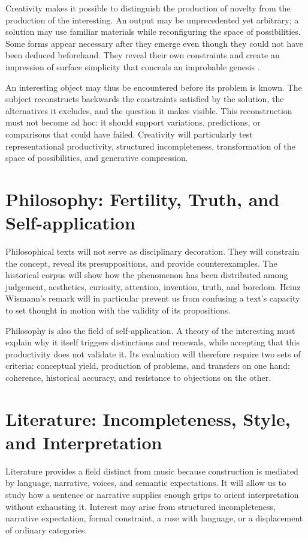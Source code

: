 \documentclass[11pt,a4paper]{article}
\begin{document}
Creativity makes it possible to distinguish the production of novelty from the
production of the interesting. An output may be unprecedented yet arbitrary; a
solution may use familiar materials while reconfiguring the space of
possibilities. Some forms appear necessary after they emerge even though they
could not have been deduced beforehand. They reveal their own constraints and
create an impression of surface simplicity that conceals an improbable genesis
\parencite{pachet2026impossibilite,pachet2026virtuosite}.

An interesting object may thus be encountered before its problem is known. The
subject reconstructs backwards the constraints satisfied by the solution, the
alternatives it excludes, and the question it makes visible. This reconstruction
must not become ad hoc: it should support variations, predictions, or
comparisons that could have failed. Creativity will particularly test
representational productivity, structured incompleteness, transformation of the
space of possibilities, and generative compression.

\section{Philosophy: Fertility, Truth, and Self-application}

Philosophical texts will not serve as disciplinary decoration. They will
constrain the concept, reveal its presuppositions, and provide counterexamples.
The historical corpus will show how the phenomenon has been distributed among
judgement, aesthetics, curiosity, attention, invention, truth, and boredom.
Heinz Wismann's remark will in particular prevent us from confusing a text's
capacity to set thought in motion with the validity of its propositions.

Philosophy is also the field of self-application. A theory of the interesting
must explain why it itself triggers distinctions and renewals, while accepting
that this productivity does not validate it. Its evaluation will therefore
require two sets of criteria: conceptual yield, production of problems, and
transfers on one hand; coherence, historical accuracy, and resistance to
objections on the other.

\section{Literature: Incompleteness, Style, and Interpretation}

Literature provides a field distinct from music because construction is
mediated by language, narrative, voices, and semantic expectations. It will
allow us to study how a sentence or narrative supplies enough grips to orient
interpretation without exhausting it. Interest may arise from structured
incompleteness, narrative expectation, formal constraint, a ruse with language,
or a displacement of ordinary categories.
\end{document}
